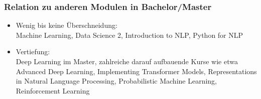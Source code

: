 \begin{frame}
  \frametitle{Relation zu anderen Modulen in Bachelor/Master}

  
  \begin{itemize}
    \item Wenig bis keine Überschneidung:\\
      Machine Learning, Data Science 2, Introduction to NLP, Python for NLP
      \item Vertiefung:\\
        Deep Learning im Master, zahlreiche darauf aufbauende Kurse wie etwa\\
        Advanced Deep Learning, Implementing Transformer Models, Representations in Natural Language Processing, Probabilistic Machine Learning, Reinforcement Learning
  \end{itemize}
  
\end{frame}





